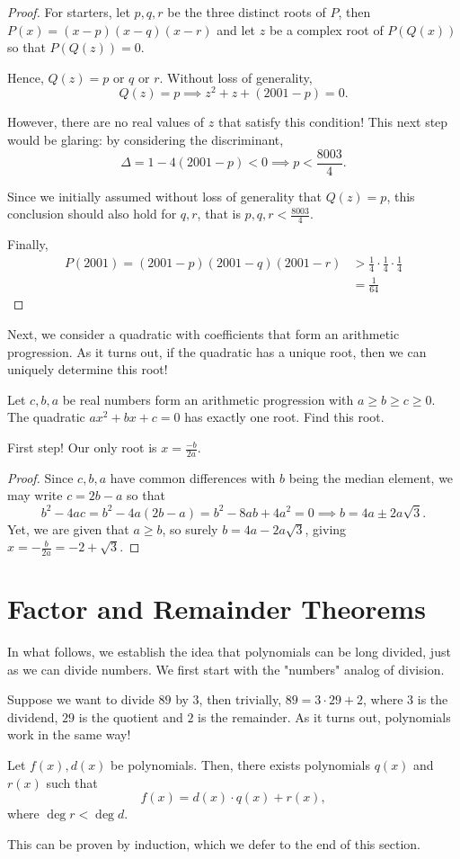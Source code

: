 \documentclass[../jarvis.tex]{subfiles}
\begin{document}
\begin{proof}
    For starters, let $p,q,r$ be the three distinct roots of $P$, then $P(x)=(x-p)(x-q)(x-r)$ and let $z$ be a complex root of $P(Q(x))$ so that $P(Q(z))=0$. 

Hence, $Q(z)=\text{$p$ or $q$ or $r$}$. Without loss of generality, $$Q(z)=p \implies z^2+z+(2001-p)=0.$$

However, there are no real values of $z$ that satisfy this condition! This next step would be glaring: by considering the discriminant,
$$\Delta=1-4(2001-p) < 0 \implies p < \frac{8003}{4}.$$

Since we initially assumed without loss of generality that $Q(z)=p$, this conclusion should also hold for $q, r$, that is $p,q,r < \frac{8003}{4}$.

Finally, \begin{align*}
    P(2001)=(2001-p)(2001-q)(2001-r) &> \frac{1}{4}\cdot\frac{1}{4}\cdot\frac{1}{4} \\
    &=\frac{1}{64}
\end{align*}
\end{proof}
Next, we consider a quadratic with coefficients that form an arithmetic progression. As it turns out, if the quadratic has a unique root, then we can uniquely determine this root!
\begin{example}[2013 AMC 10B P19]
    Let $c,b,a$ be real numbers form an arithmetic progression with $a\geq b\geq c\geq 0$. The quadratic $ax^2+bx+c=0$ has exactly one root. Find this root.
\end{example}
First step! Our only root is $x=\frac{-b}{2a}$.

\begin{proof}
    Since $c,b,a$ have common differences with $b$ being the median element, we may write $c=2b-a$ so that 
$$b^2-4ac=b^2-4a(2b-a)=b^2-8ab+4a^2=0 \implies b=4a\pm2a\sqrt{3}.$$
Yet, we are given that $a\geq b$, so surely $b=4a-2a\sqrt{3}$, giving $x=-\frac{b}{2a}=\boxed{-2+\sqrt{3}}.$
\end{proof}

\section{Factor and Remainder Theorems \ez}
In what follows, we establish the idea that polynomials can be long divided, just as we can divide numbers. We first start with the "numbers" analog of division.

Suppose we want to divide $89$ by $3$, then trivially, $89=3\cdot 29+2$, where $3$ is the dividend, $29$ is the quotient and $2$ is the remainder. As it turns out, polynomials work in the same way!
\begin{proposition}
    Let $f(x), d(x)$ be polynomials. Then, there exists polynomials $q(x)$ and $r(x)$ such that
    $$f(x)=d(x)\cdot q(x)+r(x),$$
    where $\deg r < \deg d$.
\end{proposition}
This can be proven by induction, which we defer to the end of this section.
\end{document}
